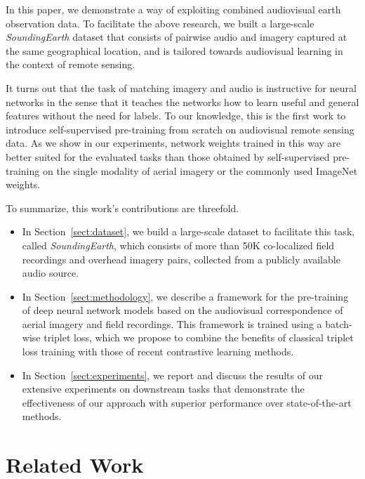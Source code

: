 \documentclass[journal]{IEEEtran}
\begin{document}
In this paper, we demonstrate a way of exploiting combined audiovisual earth observation data.
To facilitate the above research, we built a large-scale \emph{SoundingEarth} dataset that consists of pairwise audio and imagery captured at the same geographical location, and is tailored towards audiovisual learning in the context of remote sensing. 
 
It turns out that the task of matching imagery and audio is
instructive for neural networks in the sense that it teaches the networks
how to learn useful and general features without the need for labels.
To our knowledge, this is the first work to introduce self-supervised
pre-training from scratch on audiovisual remote sensing data.
As we show in our experiments, network weights trained in this way are
better suited for the evaluated tasks
than those obtained by self-supervised pre-training on the single modality of
aerial imagery or the commonly used ImageNet weights.



To summarize, this work's contributions are threefold.
\begin{itemize}
    \item In Section~\ref{sect:dataset}, we build a large-scale dataset to facilitate this task, called \emph{SoundingEarth}, which consists of more than 50K co-localized field recordings and overhead imagery pairs, collected from a publicly available audio source.
    \item In Section~\ref{sect:methodology},
    we describe a framework for the pre-training of
    deep neural network models based on the audiovisual correspondence of
    aerial imagery and field recordings. 
    This framework is trained using a batch-wise triplet loss,
    which we propose to combine the benefits of classical triplet loss training
    with those of recent contrastive learning methods.
    \item In Section~\ref{sect:experiments}, we report and discuss the results
    of our extensive experiments on downstream
    tasks that demonstrate the effectiveness of our approach with superior performance over state-of-the-art methods.
\end{itemize}

\section{Related Work}
\end{document}
